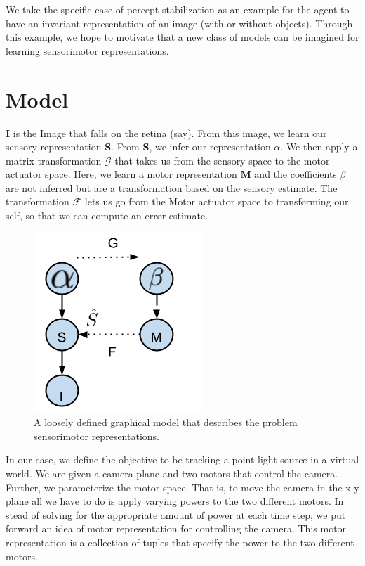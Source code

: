 \documentclass[conference]{IEEEtran}
\begin{document}
We take the specific case of percept stabilization as an example for the agent to have an invariant representation of an image (with or without objects). Through this example, we hope to motivate that a new class of models can be imagined for learning sensorimotor representations.

\section{Model}
\textbf{I} is the Image that falls on the retina (say). From this image, we learn our sensory representation \textbf{S}. From \textbf{S}, we infer our representation \textbf{$\alpha$}. We then apply a matrix transformation $\mathcal{G}$ that takes us from the sensory space to the motor actuator space. Here, we learn a motor representation \textbf{M} and the coefficients \textbf{$\beta$} are not inferred but are a transformation based on the sensory estimate. The transformation $\mathcal{F}$ lets us go from the Motor actuator space to transforming our self, so that we can compute an error estimate. 

\begin{figure}
\includegraphics[scale=0.6]{sesemo1.png}
\caption{A loosely defined graphical model that describes the problem sensorimotor representations. }
\end{figure}

In our case, we define the objective to be tracking a point light source in a virtual world. We are given a camera plane and two motors that control the camera. Further, we parameterize the motor space. That is, to move the camera in the x-y plane all we have to do is apply varying powers to the two different motors. In stead of solving for the appropriate amount of power at each time step, we put forward an idea of motor representation for controlling the camera. This motor representation is a collection of tuples that specify the power to the two different motors. 
\end{document}
